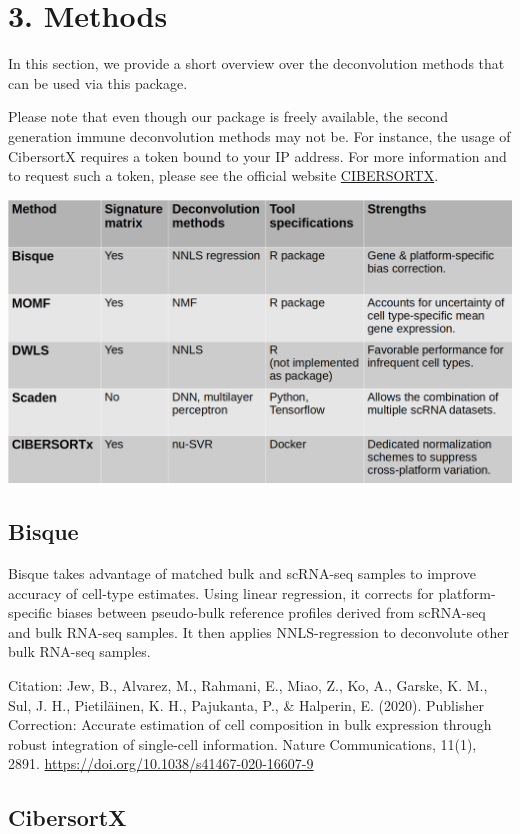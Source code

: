 \documentclass[
]{article}
\begin{document}
\hypertarget{methods}{%
\section{3. Methods}\label{methods}}

In this section, we provide a short overview over the deconvolution
methods that can be used via this package.

Please note that even though our package is freely available, the second
generation immune deconvolution methods may not be. For instance, the
usage of CibersortX requires a token bound to your IP address. For more
information and to request such a token, please see the official website
\href{https://cibersortx.stanford.edu/}{CIBERSORTX}.

\includegraphics[width=0.8\linewidth]{images/methods_table}

\hypertarget{bisque}{%
\subsection{Bisque}\label{bisque}}

Bisque takes advantage of matched bulk and scRNA-seq samples to improve
accuracy of cell-type estimates. Using linear regression, it corrects
for platform-specific biases between pseudo-bulk reference profiles
derived from scRNA-seq and bulk RNA-seq samples. It then applies
NNLS-regression to deconvolute other bulk RNA-seq samples.

Citation: Jew, B., Alvarez, M., Rahmani, E., Miao, Z., Ko, A., Garske,
K. M., Sul, J. H., Pietiläinen, K. H., Pajukanta, P., \& Halperin, E.
(2020). Publisher Correction: Accurate estimation of cell composition in
bulk expression through robust integration of single-cell information.
Nature Communications, 11(1), 2891.
\url{https://doi.org/10.1038/s41467-020-16607-9}

\hypertarget{cibersortx}{%
\subsection{CibersortX}\label{cibersortx}}
\end{document}
